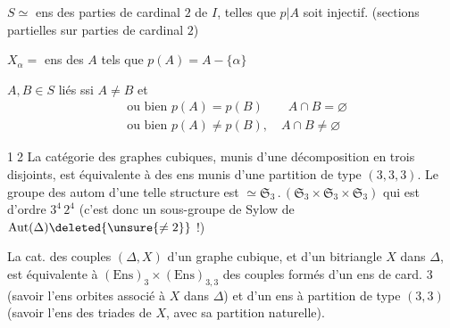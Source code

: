 $S\simeq$ ens des parties  de cardinal $2$ de $I$, telles que $p|A$ soit injectif. (sections partielles sur parties de cardinal $2$)

$X_\alpha=$ ens des $A$ tels que $p(A)=A-\{\alpha\}$

$A,B\in S$ liés ssi $A\ne B$ et
\[
\begin{aligned}
 &\text{ou bien }p(A)=p(B)\qquad A\cap B=\varnothing\\
 &\text{ou bien }p(A)\ne p(B),\quad A\cap B\ne\varnothing
\end{aligned}
\]

\textcircled{\scriptsize 12} La catégorie des graphes cubiques, munis d'une décomposition en trois   disjoints, est équivalente à   des ens  munis d'une partition de type $(3,3,3)$. Le groupe des autom d'une telle structure est $\simeq\mathfrak S_3\mathbin{.}(\mathfrak S_3\times\mathfrak S_3\times\mathfrak S_3)$ qui est d'ordre $3^4\,2^4$ (c'est donc  un sous-groupe de Sylow de $\mathrm{Aut}(\Delta)\deleted{\unsure{\ne2}}$ !)


La cat. des couples $(\Delta,X)$ d'un graphe cubique, et d'un bitriangle $X$ dans $\Delta$, est équivalente à    $(\mathrm{Ens})_3\times(\mathrm{Ens})_{3,3}$ des couples formés d'un ens de card. $3$ (savoir l'ens    orbites associé à $X$ dans $\Delta$) et d'un ens à partition de type $(3,3)$ (savoir l'ens des triades de $X$, \deleted{\unsure{\}|)}} avec sa partition naturelle).
